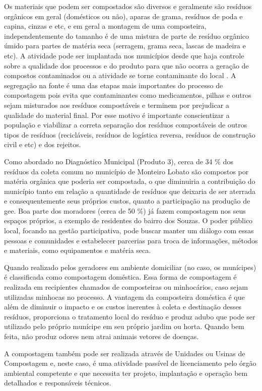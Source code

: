 Os materiais que podem ser compostados são diversos e geralmente são resíduos orgânicos em geral (domésticos ou não), aparas de grama, resíduos de poda e capina, cinzas e etc, e em geral a montagem de uma composteira, independentemente do tamanho é de uma mistura de parte de resíduo orgânico úmido para partes de matéria seca (serragem, grama seca, lascas de madeira e etc). A atividade pode ser implantada nos municípios desde que haja controle sobre a qualidade dos processos e do produto para que não ocorra a geração de compostos contaminados ou a atividade se torne contaminante do local \cite{felipetto_conceito_2007}. A segregação na fonte é uma das etapas mais importantes do processo de compostagem pois evita que contaminantes como medicamentos, pilhas e outros sejam misturados aos resíduos compostáveis e terminem por prejudicar a qualidade do material final. Por esse motivo é importante conscientizar a população e viabilizar a correta separação dos resíduos compostáveis de outros tipos de resíduos (recicláveis, resíduos de logística reversa, resíduos de construção civil e etc) e dos rejeitos.

Como abordado no Diagnóstico Municipal (Produto 3), cerca de 34 \% dos resíduos da coleta comum no município de Monteiro Lobato são compostos por matéria orgânica que poderia ser compostada, o que diminuiria a contribuição do município tanto em relação a quantidade de resíduos que deixaria de ser aterrada e consequentemente seus próprios custos, quanto a participação na produção de \gls{gee}. Boa parte dos moradores (cerca de 50 \%) já fazem compostagem nos seus espaços próprios, a exemplo de residentes do bairro dos Souzas. O poder público local, focando na gestão participativa, pode buscar manter um diálogo com essas pessoas e comunidades e estabelecer parcerias para troca de informações, métodos e materiais, como equipamentos e matéria seca.

Quando realizado pelos geradores em ambiente domiciliar (no caso, os munícipes) é classificada como compostagem doméstica. Essa forma de compostagem é realizada em recipientes chamados de composteiras ou minhocários, caso sejam utilizadas minhocas no processo. A vantagem da composteira doméstica é que além de diminuir o impacto e os custos inerentes à coleta e destinação desses resíduos, proporciona o tratamento local do resíduo e produz adubo que pode ser utilizado pelo próprio munícipe em seu próprio jardim ou horta. Quando bem feita, não produz odores nem atrai animais vetores de doenças.

A compostagem também pode ser realizada através de Unidades ou Usinas de Compostagem e, neste caso, é uma atividade passível de licenciamento pelo órgão ambiental competente e que necessita ter projeto, implantação e operação bem detalhados e responsáveis técnicos. 

